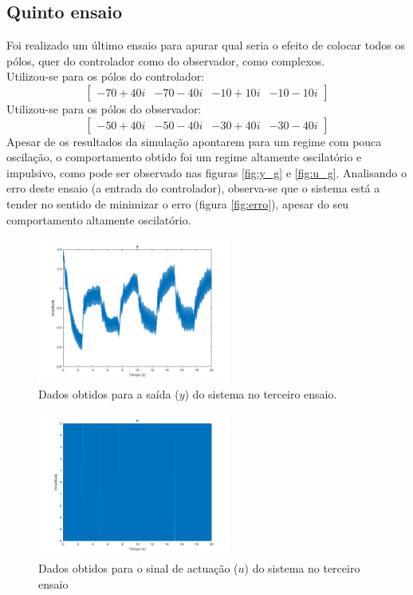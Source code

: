 \documentclass[%
  reprint,
  nofootinbib,
  amsmath,amssymb,
  aps,
  10pt,
  a4paper
]{revtex4-1}
\begin{document}
\subsection{Quinto ensaio}
Foi realizado um último ensaio para apurar qual seria o efeito de colocar todos os pólos, quer do controlador como do observador, como complexos.\\
Utilizou-se para os pólos do controlador:
\begin{equation}
\begin{bmatrix}
-70+40i & -70-40i & -10+10i &-10-10i
\end{bmatrix}
\end{equation}
Utilizou-se para os pólos do observador:
\begin{equation}
\begin{bmatrix}
-50+40i & -50-40i & -30+40i &-30-40i
\end{bmatrix}
\end{equation}
Apesar de os resultados da simulação apontarem para um regime com pouca oscilação, o comportamento obtido foi um regime altamente oscilatório e impulsivo, como pode ser observado nas figuras \ref{fig:y_g} e \ref{fig:u_g}.
Analisando o erro deste ensaio (a entrada do controlador), observa-se que o sistema está a tender no sentido de minimizar o erro (figura \ref{fig:erro}), apesar do seu comportamento altamente oscilatório.
\begin{figure}
\includegraphics[width=2.5in]{../imgs/dados_00_g/dados_00_g_y.png}
\caption{Dados obtidos para a saída ($y$) do sistema no terceiro ensaio.}
\label{fig:y_f}
\end{figure}
\begin{figure}
\includegraphics[width=2.5in]{../imgs/dados_00_g/dados_00_g_u.png}
\caption{Dados obtidos para o sinal de actuação ($u$) do sistema no terceiro ensaio}
\label{fig:u_f}
\end{figure}
\end{document}

